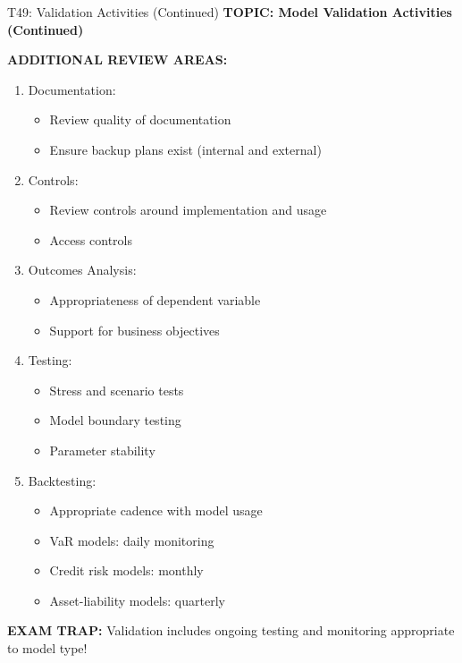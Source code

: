 \documentclass[8pt]{beamer}
\begin{document}
	\begin{frame}{T49: Validation Activities (Continued)}
		\fontsize{6.5}{7.5}\selectfont
		\textbf{TOPIC: Model Validation Activities (Continued)}
		
		\vspace{0.1cm}
		\textbf{ADDITIONAL REVIEW AREAS:}
		\begin{enumerate}
			\item \textcolor{myblue}{Documentation:}
			\begin{itemize}
				\item Review quality of documentation
				\item Ensure backup plans exist (internal and external)
			\end{itemize}
			\item \textcolor{myblue}{Controls:}
			\begin{itemize}
				\item Review controls around implementation and usage
				\item Access controls
			\end{itemize}
			\item \textcolor{myblue}{Outcomes Analysis:}
			\begin{itemize}
				\item Appropriateness of dependent variable
				\item Support for business objectives
			\end{itemize}
			\item \textcolor{myblue}{Testing:}
			\begin{itemize}
				\item Stress and scenario tests
				\item Model boundary testing
				\item Parameter stability
			\end{itemize}
			\item \textcolor{myblue}{Backtesting:}
			\begin{itemize}
				\item Appropriate cadence with model usage
				\item VaR models: daily monitoring
				\item Credit risk models: monthly
				\item Asset-liability models: quarterly
			\end{itemize}
		\end{enumerate}
		
		\textcolor{myred}{\textbf{EXAM TRAP:}} Validation includes \textcolor{myblue}{ongoing testing and monitoring appropriate to model type}!
	\end{frame}
	
\end{document}
